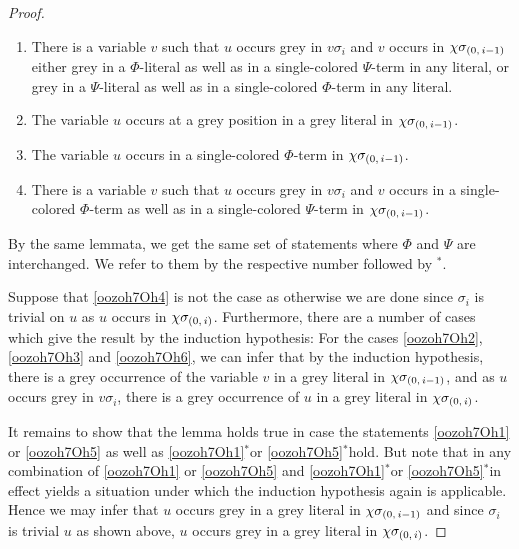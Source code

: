 \documentclass[,%
	draft=false,%
	numbers=noendperiod
	12pt,
	a4paper,
	oneside,%
	openany,
]{memoir}
\newcommand{\inv}{\ensuremath{\chi}}
\begin{document}
\begin{proof}
\begin{enumerate}
		\item 
			\label{oozoh7Oh3}
			There is a variable $v$ such that $u$ occurs grey in $v\sigma_i$ and $v$ occurs in $\inv\sigmazmi$
			either grey in a $\Phi$-literal as well as in a single-colored $\Psi$-term in any literal, 
			or grey in a $\Psi$-literal as well as in a single-colored $\Phi$-term in any literal.

		\item
			\label{oozoh7Oh4}
			The variable $u$ occurs at a grey position in a grey literal in $\inv\sigmazmi$.

		\item
			\label{oozoh7Oh5}
			The variable $u$ occurs in a single-colored $\Phi$-term in $\inv\sigmazmi$.

		\item
			\label{oozoh7Oh6}
			There is a variable $v$ such that $u$ occurs grey in $v\sigma_i$ and $v$ occurs in a single-colored $\Phi$-term as well as in a single-colored $\Psi$-term in $\inv\sigmazmi$.


	\end{enumerate}

	\newcommand{\othercase}{$^*$}

	By the same lemmata, we get the same set of statements where $\Phi$ and $\Psi$ are interchanged. We refer to them by the respective number followed by \othercase.

	Suppose that \ref{oozoh7Oh4} is not the case as otherwise we are done since $\sigma_i$ is trivial on $u$ as $u$ occurs in $\inv\sigmazi$.
	Furthermore, there are a number of cases which give the result by the induction hypothesis:
	For the cases \ref{oozoh7Oh2}, \ref{oozoh7Oh3} and \ref{oozoh7Oh6}, we can infer that by the induction hypothesis, there is a grey occurrence of the variable $v$ in a grey literal in $\inv\sigmazmi$, and as $u$ occurs grey in $v\sigma_i$, there is a grey occurrence of $u$ in a grey literal in $\inv\sigmazi$.

	It remains to show that the lemma holds true in case the statements \ref{oozoh7Oh1} or \ref{oozoh7Oh5} as well as \ref{oozoh7Oh1}\othercase or \ref{oozoh7Oh5}\othercase hold.
	But note that in any combination of \ref{oozoh7Oh1} or \ref{oozoh7Oh5} and \ref{oozoh7Oh1}\othercase or \ref{oozoh7Oh5}\othercase in effect yields a situation under which the induction hypothesis again is applicable.
	Hence we may infer that $u$ occurs grey in a grey literal in $\inv\sigmazmi$ and since $\sigma_i$ is trivial $u$ as shown above, $u$ occurs grey in a grey literal in $\inv\sigmazi$.
\end{proof}
\end{document}
